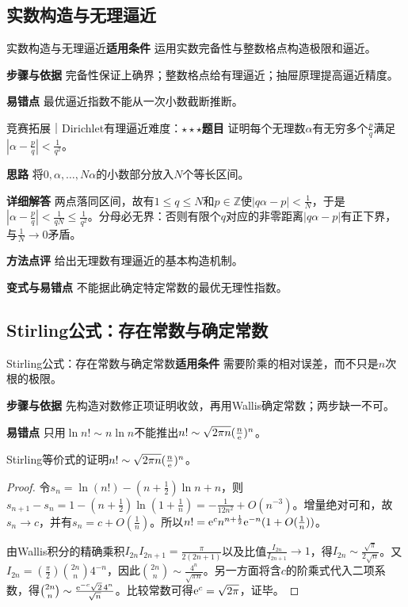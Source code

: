 \subsection{实数构造与无理逼近}\label{deep:limits_source_deep:real}

\begin{method}{实数构造与无理逼近}\textbf{适用条件} 运用实数完备性与整数格点构造极限和逼近。\par\textbf{步骤与依据} 完备性保证上确界；整数格点给有理逼近；抽屉原理提高逼近精度。\par\textbf{易错点} 最优逼近指数不能从一次小数截断推断。\end{method}

\begin{example}{竞赛拓展｜Dirichlet有理逼近}{难度：$\star\star\star$}\label{deep:ex:limits_source_deep:dirichlet}\textbf{题目} 证明每个无理数$\alpha$有无穷多个$\frac{p}{q}$满足$|\alpha-\frac{p}{q}|<\frac{1}{q^2}$。\par\textbf{思路} 将$0,\alpha,\ldots,N\alpha$的小数部分放入$N$个等长区间。\par\textbf{详细解答} 两点落同区间，故有$1\le q\le N$和$p\in\mathbb Z$使$|q\alpha-p|<\frac{1}{N}$，于是$|\alpha-\frac{p}{q}|<\frac{1}{qN}\le\frac{1}{q^2}$。分母必无界：否则有限个$q$对应的非零距离$|q\alpha-p|$有正下界，与$\frac{1}{N}\to0$矛盾。\par\textbf{方法点评} 给出无理数有理逼近的基本构造机制。\par\textbf{变式与易错点} 不能据此确定特定常数的最优无理性指数。\end{example}

\subsection{Stirling公式：存在常数与确定常数}\label{deep:limits_source_deep:stirlingproof}

\begin{method}{Stirling公式：存在常数与确定常数}\textbf{适用条件} 需要阶乘的相对误差，而不只是$n$次根的极限。\par\textbf{步骤与依据} 先构造对数修正项证明收敛，再用Wallis确定常数；两步缺一不可。\par\textbf{易错点} 只用$\ln n!\sim n\ln n$不能推出$n!\sim\sqrt{2\pi n}(\frac{n}{\mathrm{e}})^n$。\end{method}

\begin{theorem}{Stirling等价式的证明}$n!\sim\sqrt{2\pi n}(\frac{n}{\mathrm{e}})^n$。\end{theorem}\begin{proof}令$s_n=\ln(n!)-(n+\frac12)\ln n+n$，则$s_{n+1}-s_n=1-(n+\frac12)\ln(1+\frac{1}{n})=-\frac{1}{12n^2}+O(n^{-3})$。增量绝对可和，故$s_n\to c$，并有$s_n=c+O(\frac{1}{n})$。所以$n!=\mathrm{e}^c n^{n+\frac{1}{2}}\mathrm{e}^{-n}(1+O(\frac{1}{n}))$。\par 由Wallis积分的精确乘积$I_{2n}I_{2n+1}=\frac{\pi}{2(2n+1)}$以及比值$\frac{I_{2n}}{I_{2n+1}}\to1$，得$I_{2n}\sim\frac{\sqrt\pi}{2\sqrt n}$。又$I_{2n}=(\frac{\pi}{2})\binom{2n}n4^{-n}$，因此$\binom{2n}n\sim\frac{4^n}{\sqrt{\pi n}}$。另一方面将含$c$的阶乘式代入二项系数，得$\binom{2n}n\sim\frac{\mathrm{e}^{-c}\sqrt2\,4^n}{\sqrt n}$。比较常数可得$\mathrm{e}^c=\sqrt{2\pi}$，证毕。\end{proof}

